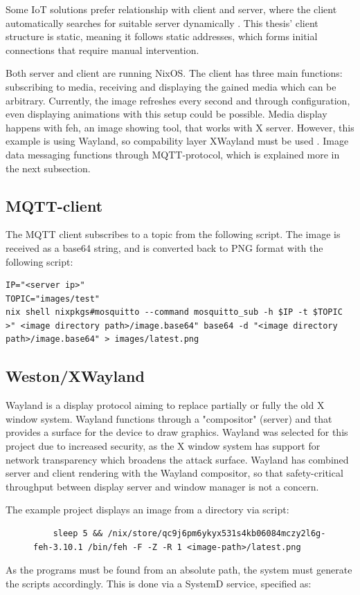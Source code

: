 Some IoT solutions prefer relationship with client and
server, where the client automatically searches for suitable server
dynamically \cite{kandoi2021operating}. This thesis' client structure
is static, meaning it follows static addresses, which forms initial
connections that require manual intervention.

Both server and client are running NixOS. The client has three main
functions: subscribing to media, receiving and displaying the gained
media which can be arbitrary. Currently, the image refreshes every
second and through configuration, even displaying animations with this
setup could be possible. Media display happens with feh, an image
showing tool, that works with X server. However, this example is using
Wayland, so compability layer XWayland must be used
\cite{waylandWayland}. Image data messaging functions through
MQTT-protocol, which is explained more in the next subsection.

\subsection{MQTT-client}
The MQTT client subscribes to a topic from the following script. The
image is received as a base64 string, and is converted back to PNG
format with the following script:
\begin{lstlisting}
IP="<server ip>"
TOPIC="images/test"
nix shell nixpkgs#mosquitto --command mosquitto_sub -h $IP -t $TOPIC >" <image directory path>/image.base64" base64 -d "<image directory path>/image.base64" > images/latest.png
\end{lstlisting}
\subsection{Weston/XWayland}
Wayland is a display protocol aiming to replace partially or fully the
old X window system. Wayland functions through a "compositor"
(server) and that provides a surface for the device to draw
graphics. Wayland was selected for this project due to increased
security, as the X window system has support for network transparency
which broadens the attack surface. Wayland has combined server and
client rendering with the Wayland compositor, so that safety-critical
throughput between display server and window manager is not a
concern. \cite{waylandWayland}

The example project displays an image from a directory via script:
\begin{figure}[H]
\begin{lstlisting} 
    sleep 5 && /nix/store/qc9j6pm6ykyx531s4kb06084mczy2l6g-feh-3.10.1 /bin/feh -F -Z -R 1 <image-path>/latest.png
\end{lstlisting}
\label{fehscript}
\end{figure}
As the programs must be found from an absolute path, the system must
generate the scripts accordingly. This is done via a SystemD service,
specified as:

